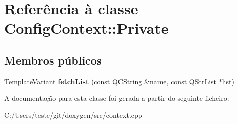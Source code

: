 \hypertarget{class_config_context_1_1_private}{\section{Referência à classe Config\-Context\-:\-:Private}
\label{class_config_context_1_1_private}
}
\subsection*{Membros públicos}
\begin{DoxyCompactItemize}
\item 
\hypertarget{class_config_context_1_1_private_a1fac7ef4ac415eecc33b08cf7c237486}{\hyperlink{class_template_variant}{Template\-Variant} {\bfseries fetch\-List} (const \hyperlink{class_q_c_string}{Q\-C\-String} \&name, const \hyperlink{class_q_str_list}{Q\-Str\-List} $\ast$list)}\label{class_config_context_1_1_private_a1fac7ef4ac415eecc33b08cf7c237486}

\end{DoxyCompactItemize}


A documentação para esta classe foi gerada a partir do seguinte ficheiro\-:\begin{DoxyCompactItemize}
\item 
C\-:/\-Users/teste/git/doxygen/src/context.\-cpp\end{DoxyCompactItemize}
